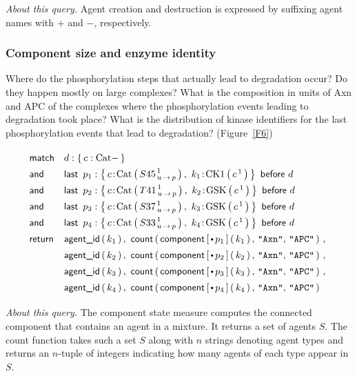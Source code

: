 \noindent \textit{About this query.} Agent creation and destruction is
expressed by suffixing agent names with $+$ and $-$,
respectively.


\subsubsection*{Component size and enzyme identity} 
Where do the phosphorylation steps that actually lead to degradation
occur? Do they happen mostly on large complexes? What is
the composition in units of Axn and APC of the complexes where the
phosphorylation events leading to degradation took place? What is the distribution of kinase identifiers for the last phosphorylation events that lead to degradation? (Figure~\ref{F6})

\newcommand{\BigHectorStoryLine}[4]{
\LastBefore{#1:\Set{ 
          \iAG{c}{\BetaCat}{ {#2}^{\,1}_{\Trans{u}{p}}}, \ 
          \iAG{#3}{#4}{c^{\,1}}
    }}{d}
}
\newcommand{\BigHectorStoryRet}[2]{
\AgentId{#2}, \ \Count{ \Component{\StateBefore{#1}}{#2}, \, 
      \STR{Axn}, \, \STR{APC} }
}


\begin{small}
\begin{equation}
  \Query{
    \m{match} & d:\Set{ c:\BetaCat - } \\
    \m{and} & \BigHectorStoryLine{p_1}{S45}{k_1}{\CKOne} \\
    \m{and} & \BigHectorStoryLine{p_2}{T41}{k_2}{\GSK}   \\
    \m{and} & \BigHectorStoryLine{p_3}{S37}{k_3}{\GSK}   \\
    \m{and} & \BigHectorStoryLine{p_4}{S33}{k_4}{\GSK}   \\
    \m{return} 
    & \BigHectorStoryRet{p_1}{k_1} \,,\  \\
    & \BigHectorStoryRet{p_2}{k_2} \,,\ \\
    & \BigHectorStoryRet{p_3}{k_3} \,,\  \\
    & \BigHectorStoryRet{p_4}{k_4} \\
  }
\end{equation}
\end{small}

\noindent \textit{About this query.} The \textsf{component} state
measure computes the connected component that contains an agent in a
mixture. It returns a set of agents $S$. The \textsf{count} function
takes such a set $S$ along with $n$ strings denoting agent types and
returns an $n$-tuple of integers indicating how many agents of each
type appear in $S$.
